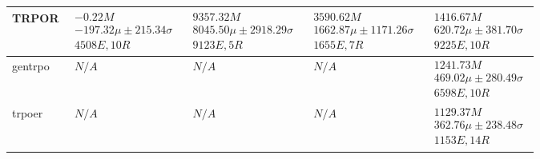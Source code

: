 \begin{tabular}{|l|p{3.2cm}|p{3.2cm}|p{3.2cm}|p{3.2cm}|}
TRPOR & $\begin{array}{c} -0.22M \\ -197.32\mu \pm 215.34\sigma \\ 4508E, 10R \end{array}$ & $\begin{array}{c} 9357.32M \\ 8045.50\mu \pm 2918.29\sigma \\ 9123E, 5R \end{array}$ & $\begin{array}{c} 3590.62M \\ 1662.87\mu \pm 1171.26\sigma \\ 1655E, 7R \end{array}$ & $\begin{array}{c} 1416.67M \\ 620.72\mu \pm 381.70\sigma \\ 9225E, 10R \end{array}$ \\  \hline
gentrpo & $\begin{array}{c} N/A \end{array}$ & $\begin{array}{c} N/A \end{array}$ & $\begin{array}{c} N/A \end{array}$ & $\begin{array}{c} 1241.73M \\ 469.02\mu \pm 280.49\sigma \\ 6598E, 10R \end{array}$ \\  \hline
trpoer & $\begin{array}{c} N/A \end{array}$ & $\begin{array}{c} N/A \end{array}$ & $\begin{array}{c} N/A \end{array}$ & $\begin{array}{c} 1129.37M \\ 362.76\mu \pm 238.48\sigma \\ 1153E, 14R \end{array}$ \\  \hline
\bottomrule  \hline
\end{tabular}
